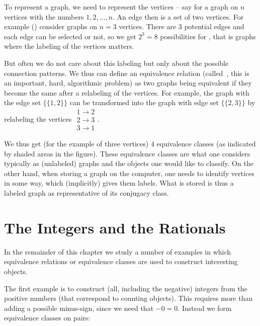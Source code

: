 To represent a graph, we need to represent the vertices -- say for a graph
on $n$ vertices with the numbers $1,2,\ldots,n$. An edge then is a set of
two vertices. For example () consider graphs on $n=3$
vertices. There are 3 potential edges and each edge can be selected or not,
so we get $2^3=8$ possibilities for , that is graphs
where the labeling of the vertices matters.

But often we do not care about this labeling but only  about the possible
connection patterns. We thus can define an equivalence relation
(called~, this is an important, hard, algorithmic
problem) 
as two graphs being equivalent if they become the same after a
relabeling of the vertices. For example, the graph with the edge set
$\{\{1,2\}\}$ can be transformed into the graph with edge set $\{\{2,3\}\}$ by
relabeling 
the vertices $\begin{array}{c}1\to 2\\2\to3\\3\to1\end{array}$.

We thus get (for the example of three vertices) $4$ equivalence classes
(as indicated by shaded areas in the figure). These equivalence classes are
what one considers typically as (unlabeled) graphs and the objects one would
like to classify. On the other hand, when storing a graph on the computer,
one needs to identify vertices in some way, which (implicitly) gives them
labels. What is stored is thus a labeled graph as representative of its
conjugacy class.

\section{The Integers and the Rationals}

In the remainder of this chapter we study a number of examples in which
equivalence relations or equivalence classes are used to construct
interesting objects.
\smallskip

The first example is to construct (all, including the negative) integers
from the positive numbers (that correspond to counting objects). This
requires more than adding a possible minus-sign, since we need that $-0=0$.
Instead we form equivalence classes on pairs:

